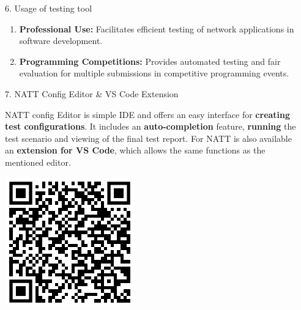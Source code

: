 \documentclass[final]{beamer}
\newlength{\sepwidth}
\newlength{\colwidth}
\newcommand{\separatorcolumn}{\begin{column}{\sepwidth}\end{column}}
\begin{document}
\begin{frame}[t]
\begin{columns}[t]
\begin{column}{\colwidth}
\begin{exampleblock}{6. Usage of testing tool}
\begin{enumerate}
      \item \textbf{Professional Use:} Facilitates efficient testing of network applications in software development.
      
      \item \textbf{Programming Competitions:} Provides automated testing and fair evaluation for multiple submissions in competitive programming events.
   \end{enumerate}
 
  \end{exampleblock}

  \begin{block}{7. NATT Config Editor \& VS Code Extension}

    \begin{minipage}{0.7\textwidth}
      NATT config Editor is simple IDE and offers an easy interface for \textbf{creating test configurations}. It includes an 
      \textbf{auto-completion} feature, \textbf{running} the test scenario and viewing of the final test report. For NATT is 
      also available an \textbf{extension for VS Code}, which allows the same functions as the mentioned editor.
    \end{minipage}
    \hfill
    \noindent\begin{minipage}{0.25\textwidth}
      \includegraphics[width=\textwidth]{./imgs/extension_qr.png}
    \end{minipage}

  \end{block}

\end{column}

\separatorcolumn
\end{columns}
\end{frame}
\end{document}
